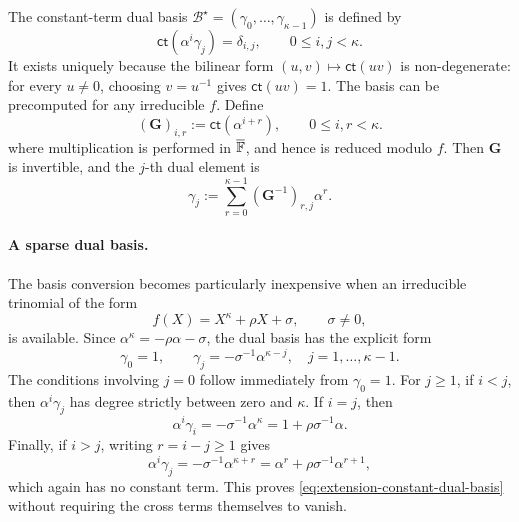 \documentclass[runningheads]{llncs}
\begin{document}
The constant-term dual basis
\(\mathcal B^\star=(\gamma_0,\ldots,\gamma_{\kappa-1})\) is defined by
\begin{equation}
    \mathsf{ct}(\alpha^i\gamma_j)=\delta_{i,j},
    \qquad
    0\leq i,j<\kappa.
\label{eq:extension-constant-dual-basis}
\end{equation}
It exists uniquely because the bilinear form
\((u,v)\mapsto\mathsf{ct}(uv)\) is non-degenerate: for every
\(u\ne0\), choosing \(v=u^{-1}\) gives \(\mathsf{ct}(uv)=1\).
The basis can be precomputed for any irreducible \(f\).  Define
\begin{equation}
    (\bm G)_{i,r}
      :=\mathsf{ct}\!\left(\alpha^{i+r}\right),
    \qquad
    0\leq i,r<\kappa.
\label{eq:extension-constant-gram-matrix}
\end{equation}
where multiplication is performed in \(\overline{{\mathbb{F}}}\), and hence
is reduced modulo \(f\).  Then \(\bm G\) is invertible, and the
\(j\)-th dual element is
\begin{equation}
    \gamma_j
      :=\sum_{r=0}^{\kappa-1}
        (\bm G^{-1})_{r,j}\alpha^r.
\label{eq:extension-constant-dual-construction}
\end{equation}

\paragraph{A sparse dual basis.}
The basis conversion becomes particularly inexpensive when an
irreducible trinomial of the form
\begin{equation}
    f(X)=X^\kappa+\rho X+\sigma,
    \qquad \sigma\ne0,
\label{eq:extension-sparse-modulus}
\end{equation}
is available.  Since \(\alpha^\kappa=-\rho\alpha-\sigma\), the dual
basis has the explicit form
\begin{equation}
    \boxed{
    \gamma_0=1,
    \qquad
    \gamma_j=-\sigma^{-1}\alpha^{\kappa-j},
    \quad j=1,\ldots,\kappa-1.}
\label{eq:extension-sparse-dual-basis}
\end{equation}
The conditions involving \(j=0\) follow immediately from
\(\gamma_0=1\).  For \(j\geq1\), if \(i<j\), then
\(\alpha^i\gamma_j\) has degree strictly between zero and \(\kappa\).
If \(i=j\), then
\[
    \alpha^i\gamma_i
      =-\sigma^{-1}\alpha^\kappa
      =1+\rho\sigma^{-1}\alpha.
\]
Finally, if \(i>j\), writing \(r=i-j\geq1\) gives
\[
    \alpha^i\gamma_j
      =-\sigma^{-1}\alpha^{\kappa+r}
      =\alpha^r+\rho\sigma^{-1}\alpha^{r+1},
\]
which again has no constant term.  This proves
\eqref{eq:extension-constant-dual-basis} without requiring the cross
terms themselves to vanish.
\end{document}
